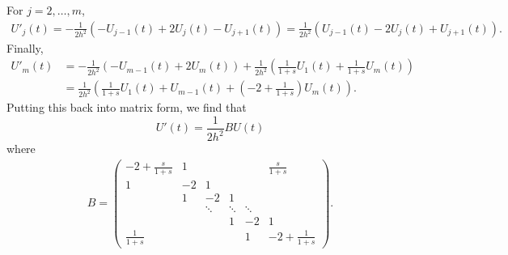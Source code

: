 \documentclass{article}
\begin{document}
For $j=2,\ldots,m$, 
\begin{align*}
U'_j(t)=-\frac{1}{2h^2}(-U_{j-1}(t)+2U_j(t)-U_{j+1}(t))=\frac{1}{2h^2}(U_{j-1}(t)-2U_j(t)+U_{j+1}(t)).
\end{align*}
Finally, 
\begin{align*}
U'_m(t)&=-\frac{1}{2h^2}(-U_{m-1}(t)+2U_m(t))+\frac{1}{2h^2}\left(\frac{1}{1+s}U_1(t)+\frac{1}{1+s}U_m(t)\right)\\&=
\frac{1}{2h^2}\left(\frac{1}{1+s}U_1(t)+U_{m-1}(t)+\left(-2+\frac{1}{1+s}\right)U_m(t)\right).
\end{align*}
Putting this back into matrix form, we find that 
\[
U'(t) = \frac{1}{2h^2} B U(t)
\]
where
\begin{align*}
B = \begin{pmatrix}
		-2 + \frac{s}{1 + s} & 1 &&&& \frac{s}{1 + s}\\
		1 & -2 & 1 \\
		& 1 & -2 & 1 & \\
		&&\ddots & \ddots & \ddots \\
		&&&1 & -2 & 1 \\
		\frac{1}{1+s} &&&& 1 & -2 + \frac{1}{1+s} \end{pmatrix}.
\end{align*}
\end{document}
